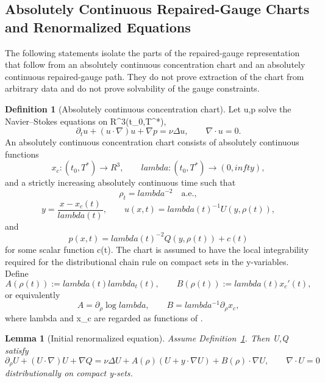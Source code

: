 \documentclass[11pt]{amsart}
\def\({}%
\def\){}%
\def\mathbb#1{#1}%
\def\lambda{lambda}%
\def\infty{infty}%
\theoremstyle{plain}
\newtheorem{lemma}[lemma]{Lemma}
\theoremstyle{definition}
\newtheorem{definition}[definition]{Definition}
\theoremstyle{remark}
\begin{document}
\subsection{Absolutely Continuous Repaired-Gauge Charts and Renormalized Equations}
\label{subsec:ac-repaired-gauge-renormalized-equations}

The following statements isolate the parts of the repaired-gauge
representation that follow from an absolutely continuous concentration chart
and an absolutely continuous repaired-gauge path.  They do not prove extraction
of the chart from arbitrary data and do not prove solvability of the gauge
constraints.

\begin{definition}[Absolutely continuous concentration chart]
\label{paper6a:def:ac-initial-concentration-chart}
Let \(u,p\) solve the Navier--Stokes equations on
\(\mathbb R^3\times(t_0,T^*)\),
\[
  \partial_tu+(u\cdot\nabla)u+\nabla p=\nu\Delta u,
  \qquad
  \nabla\cdot u=0.
\]
An absolutely continuous concentration chart consists of
absolutely continuous functions
\[
  x_c:(t_0,T^*)\to\mathbb R^3,\qquad
  \lambda:(t_0,T^*)\to(0,\infty),
\]
and a strictly increasing absolutely continuous time \(\rho\) such that
\[
  \rho_t=\lambda^{-2}\quad\text{a.e.},
\]
\[
  y=\frac{x-x_c(t)}{\lambda(t)},\qquad
  u(x,t)=\lambda(t)^{-1}U(y,\rho(t)),
\]
and
\[
  p(x,t)=\lambda(t)^{-2}Q(y,\rho(t))+c(t)
\]
for some scalar function \(c(t)\).  The chart is assumed to have the local
integrability required for the distributional chain rule on compact sets in
the \(y\)-variables.  Define
\[
  A(\rho(t)):=\lambda(t)\lambda_t(t),
  \qquad
  B(\rho(t)):=\lambda(t)x_c'(t),
\]
or equivalently
\[
  A=\partial_\rho\log\lambda,\qquad
  B=\lambda^{-1}\partial_\rho x_c ,
\]
where \(\lambda\) and \(x_c\) are regarded as functions of \(\rho\).
\end{definition}

\begin{lemma}[Initial renormalized equation]
\label{paper6a:lem:initial-renormalized-equation}
Assume Definition~\ref{paper6a:def:ac-initial-concentration-chart}.  Then \(U,Q\) satisfy
\[
  \partial_\rho U+(U\cdot\nabla)U+\nabla Q
  =
  \nu\Delta U+A(\rho)(U+y\cdot\nabla U)+B(\rho)\cdot\nabla U,
  \qquad
  \nabla\cdot U=0
\]
distributionally on compact \(y\)-sets.
\end{lemma}
\end{document}
